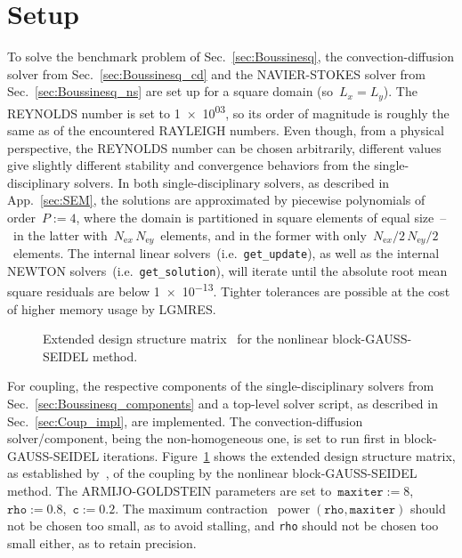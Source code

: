 \documentclass[10pt, ngerman, english,
twoside, open=right,
numbers=noenddot,
declaration=section,
abstract=section,
abstract=multiple,
abstract=notoc,
declaration=notoc,
cd=pale, 
chapterprefix=off, 
chapterpage=false, 
headingsvskip=-10em,
cdgeometry=custom, 
slantedgreek=on,
cdmath=on, 
cdfont=on,
ttfont=false,
mathswap=off,
]{tudscrreprt}
\numberwithin{equation}{chapter}
\renewcommand{\textsc}[1]{\uppercase{\mbox{#1}}}
\newcommand{\sidenote}[1]{
  \leavevmode %
  \marginpar{\hyphenpenalty=1000 \flushleft{\textcolor{HKS41}{#1}}}}
\begin{document}
\section{Setup} %
\def\mtolInternal{1e-13}
\def\mtolLin{1e-13}
\def\mtolNonlin{1e-10}
\sidenote{Single-Disciplinary Solvers Setup}To solve the benchmark problem of Sec.~\ref{sec:Boussinesq}, the convection-diffusion solver from Sec.~\ref{sec:Boussinesq_cd} and the \textsc{Navier}-\textsc{Stokes} solver from Sec.~\ref{sec:Boussinesq_ns} are set up for a square domain (so~$L_x = L_y$). 
The \textsc{Reynolds} number is set to \num{1e+03}, so its order of magnitude is roughly the same as of the encountered \textsc{Rayleigh} numbers. Even though, from a physical perspective, the \textsc{Reynolds} number can be chosen arbitrarily, different values give slightly different stability and convergence behaviors from the single-disciplinary solvers. 
In both single-disciplinary solvers, as described in App.~\ref{sec:SEM}, the solutions are approximated by piecewise polynomials of order~$P:=\num{4}$, where the domain is partitioned in square elements of equal size~--~in the latter with~$N_{\text{e}x}\, N_{\text{e}y}$~elements, and in the former with only~$N_{\text{e}x}/2\, N_{\text{e}y}/2$~elements.
The internal linear solvers~(i.e.~\texttt{get\_update}), as well as the internal \textsc{Newton} solvers~(i.e.~\texttt{get\_solution}), will iterate until the absolute root mean square residuals are below \num{\mtolInternal}. Tighter tolerances are possible at the cost of higher memory usage by LGMRES.\par
\begin{figure}[b!]
\centering

\caption{Extended design structure matrix~\cite{xdsm} for the nonlinear block-\textsc{Gau\ss}-\textsc{Seidel} method.}\label{fig:Perf_xdsm}
\end{figure}
\sidenote{\textit{OpenMDAO} Setup}For coupling, the respective components of the single-disciplinary solvers from Sec.~\ref{sec:Boussinesq_components} and a top-level solver script, as described in Sec.~\ref{sec:Coup_impl}, are implemented. The convection-diffusion solver/component, being the non-homogeneous one, is set to run first in block-\textsc{Gau\ss}-\textsc{Seidel} iterations. Figure~\ref{fig:Perf_xdsm} shows the extended design structure matrix, as established by~\cite{xdsm}, of the coupling by the nonlinear block-\textsc{Gau\ss}-\textsc{Seidel} method.
The \textsc{Armijo}-\textsc{Goldstein} parameters are set to~$\texttt{maxiter}:=\num{8}$,~$\texttt{rho}:=\num{0.8}$,~$\texttt{c}:=\num{0.2}$. The maximum contraction~$\operatorname{power}\left( \texttt{rho}, \texttt{maxiter} \right)$ should not be chosen too small, as to avoid stalling, and \texttt{rho} should not be chosen too small either, as to retain precision.
\end{document}
